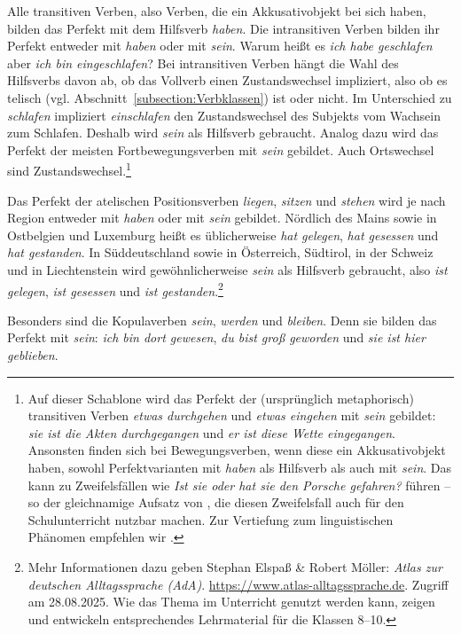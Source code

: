 Alle transitiven Verben, also Verben, die ein Akkusativobjekt bei sich haben, bilden das Perfekt mit dem Hilfsverb \textit{haben}. Die intransitiven Verben bilden ihr Perfekt entweder mit \textit{haben} oder mit \textit{sein}. Warum heißt es \textit{ich habe geschlafen} aber \textit{ich bin eingeschlafen}? Bei intransitiven Verben hängt die Wahl des Hilfsverbs davon ab, ob das Vollverb einen Zustandswechsel impliziert, also ob es telisch (vgl. Abschnitt~\ref{subsection:Verbklassen}) ist oder nicht. Im Unterschied zu \textit{schlafen} impliziert \textit{einschlafen} den Zustandswechsel des Subjekts vom Wachsein zum Schlafen. Deshalb wird \textit{sein} als Hilfsverb gebraucht. Analog dazu wird das Perfekt der meisten Fortbewegungsverben mit \textit{sein} gebildet. Auch Ortswechsel sind Zustandswechsel.\footnote{Auf dieser Schablone wird das Perfekt der (ursprünglich metaphorisch) transitiven Verben \textit{etwas durchgehen} und \textit{etwas eingehen} mit \textit{sein} gebildet: \textit{sie ist die Akten durchgegangen} und \textit{er ist diese Wette eingegangen}. Ansonsten finden sich bei Bewegungsverben, wenn diese ein Akkusativobjekt haben, sowohl Perfektvarianten mit \textit{haben} als Hilfsverb als auch mit \textit{sein}. Das kann zu Zweifelsfällen wie \textit{Ist sie oder hat sie den Porsche gefahren?} führen -- so der gleichnamige Aufsatz von \citet{BangelGillmann2017}, die diesen Zweifelsfall auch für den Schulunterricht nutzbar machen. Zur Vertiefung zum linguistischen Phänomen empfehlen wir \citet{Gillmann2011}.}

Das Perfekt der atelischen Positionsverben \textit{liegen}, \textit{sitzen} und \textit{stehen} wird je nach Region entweder mit \textit{haben} oder mit \textit{sein} gebildet. Nördlich des Mains sowie in Ostbelgien und Luxemburg heißt es üblicherweise \textit{hat gelegen}, \textit{hat gesessen} und \textit{hat gestanden}. In Süddeutschland sowie in Österreich, Südtirol, in der Schweiz und in Liechtenstein wird gewöhnlicherweise \textit{sein} als Hilfsverb gebraucht, also \textit{ist gelegen}, \textit{ist gesessen} und \textit{ist gestanden}.\footnote{Mehr Informationen dazu geben Stephan Elspaß \& Robert Möller: \textit{Atlas zur deutschen Alltagssprache (AdA)}. \url{https://www.atlas-alltagssprache.de}. Zugriff am 28.08.2025. Wie das Thema im Unterricht genutzt werden kann, zeigen \citet{Konitzer_Freywald_2024} und entwickeln entsprechendes Lehrmaterial für die Klassen 8–10.}


Besonders sind die Kopulaverben \textit{sein}, \textit{werden} und \textit{bleiben}. Denn sie bilden das Perfekt mit \textit{sein}: \textit{ich bin dort gewesen}, \textit{du bist groß geworden} und \textit{sie ist hier geblieben}. 


